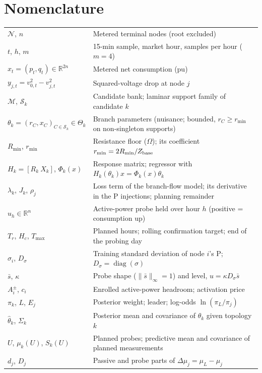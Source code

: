 \documentclass[journal,onecolumn,11pt]{IEEEtran}
\DeclareMathOperator{\diag}{diag}
\newcommand{\R}{\mathbb{R}}
\begin{document}
\section*{Nomenclature}
\begin{tabular}{@{}p{}p{}@{}}
\toprule
$\mathcal N$, $n$ & Metered terminal nodes (root excluded)\\
$t$, $h$, $m$ & 15-min sample, market hour, samples per hour ($m=4$)\\
$x_t=(p_t,q_t)\in\R^{2n}$ & Metered net consumption (pu)\\
$y_{j,t}=v_{0,t}^2-v_{j,t}^2$ & Squared-voltage drop at node $j$\\
$\mathcal M$, $\mathcal S_k$ & Candidate bank; laminar support family of candidate $k$\\
$\theta_k=(r_C,x_C)_{C\in\mathcal S_k}\in\Theta_k$ & Branch parameters (nuisance; bounded, $r_C\ge r_{\min}$ on non-singleton supports)\\
$R_{\min}$, $r_{\min}$ & Resistance floor ($\Omega$); its coefficient $r_{\min}=2R_{\min}/Z_{\rm base}$\\
$H_k=[R_k\ X_k]$, $\Phi_k(x)$ & Response matrix; regressor with $H_k(\theta_k)x=\Phi_k(x)\theta_k$\\
$\lambda_k$, $J_k$, $\rho_j$ & Loss term of the branch-flow model; its derivative in the P injections; planning remainder\\
$u_h\in\R^n$ & Active-power probe held over hour $h$ (positive = consumption up)\\
$T_r$, $H_c$, $T_{\max}$ & Planned hours; rolling confirmation target; end of the probing day\\
$\sigma_i$, $D_\sigma$ & Training standard deviation of node $i$'s P; $D_\sigma=\diag(\sigma)$\\
$\bar s$, $\kappa$ & Probe shape ($\|\bar s\|_\infty=1$) and level, $u=\kappa D_\sigma\bar s$\\
$A_i^\pm$, $c_i$ & Enrolled active-power headroom; activation price\\
$\pi_k$, $L$, $E_j$ & Posterior weight; leader; log-odds $\ln(\pi_L/\pi_j)$\\
$\hat\theta_k$, $\Sigma_k$ & Posterior mean and covariance of $\theta_k$ given topology $k$\\
$U$, $\mu_k(U)$, $S_k(U)$ & Planned probes; predictive mean and covariance of planned measurements\\
$d_j$, $D_j$ & Passive and probe parts of $\Delta\mu_j=\mu_L-\mu_j$\\

\end{tabular}
\end{document}
